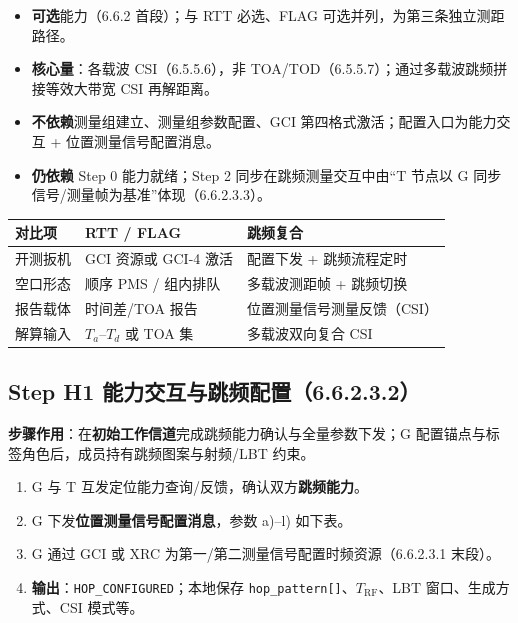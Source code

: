 \documentclass[11pt,a4paper]{ctexart}
\begin{document}
\begin{itemize}[nosep]
  \item \textbf{可选}能力（6.6.2 首段）；与 RTT 必选、FLAG 可选并列，为第三条独立测距路径。
  \item \textbf{核心量}：各载波 CSI（6.5.5.6），非 TOA/TOD（6.5.5.7）；通过多载波跳频拼接等效大带宽 CSI 再解距离。
  \item \textbf{不依赖}测量组建立、测量组参数配置、GCI 第四格式激活；配置入口为能力交互 + 位置测量信号配置消息。
  \item \textbf{仍依赖} Step 0 能力就绪；Step 2 同步在跳频测量交互中由``T 节点以 G 同步信号/测量帧为基准''体现（6.6.2.3.3）。
\end{itemize}

\begin{table}[h]
\centering
\small
\begin{tabular}{L{2.2cm}L{4.5cm}L{4.5cm}}
\toprule
\textbf{对比项} & \textbf{RTT / FLAG} & \textbf{跳频复合} \\
\midrule
开测扳机 & GCI 资源或 GCI-4 激活 & 配置下发 + 跳频流程定时 \\
空口形态 & 顺序 PMS / 组内排队 & 多载波测距帧 + 跳频切换 \\
报告载体 & 时间差/TOA 报告 & 位置测量信号测量反馈（CSI） \\
解算输入 & $T_a$--$T_d$ 或 TOA 集 & 多载波双向复合 CSI \\
\bottomrule
\end{tabular}
\end{table}

\subsection{Step H1 能力交互与跳频配置（6.6.2.3.2）}

\textbf{步骤作用}：在\textbf{初始工作信道}完成跳频能力确认与全量参数下发；G 配置锚点与标签角色后，成员持有跳频图案与射频/LBT 约束。

\begin{enumerate}
  \item G 与 T 互发定位能力查询/反馈，确认双方\textbf{跳频能力}。
  \item G 下发\textbf{位置测量信号配置消息}，参数 a)--l) 如下表。
  \item G 通过 GCI 或 XRC 为第一/第二测量信号配置时频资源（6.6.2.3.1 末段）。
  \item \textbf{输出}：\texttt{HOP\_CONFIGURED}；本地保存 \texttt{hop\_pattern[]}、$T_{\mathrm{RF}}$、LBT 窗口、生成方式、CSI 模式等。
\end{enumerate}
\end{document}
